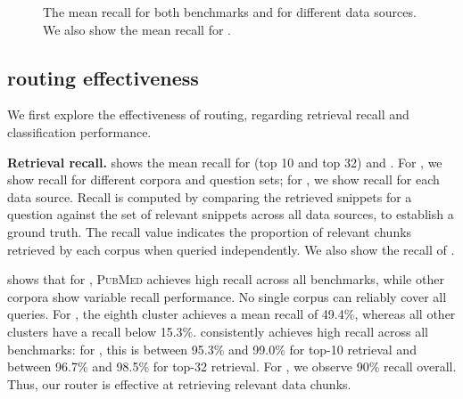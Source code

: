 \begin{figure*}[t]
    \centering
    \caption{The mean recall for both benchmarks and for different data sources. We also show the mean recall for \sys.}
    \label{fig:recall}
\end{figure*}


\subsection{\sys routing effectiveness}
\label{sec:exp_routing_effectiveness}
We first explore the effectiveness of \sys routing, regarding retrieval recall and classification performance.

\textbf{Retrieval recall.}
 shows the mean recall for \mirage (top 10 and top 32) and \mmlu.
For \mirage, we show recall for different corpora and question sets; for \mmlu, we show recall for each data source.
Recall is computed by comparing the retrieved snippets for a question against the set of relevant snippets across all data sources, to establish a ground truth.
The recall value indicates the proportion of relevant chunks retrieved by each corpus when queried independently. We also show the recall of \sys.

 shows that for \mirage, \textsc{PubMed} achieves high recall across all benchmarks, while other corpora show variable recall performance.
No single corpus can reliably cover all queries.
For \mmlu, the eighth cluster achieves a mean recall of 49.4\%, whereas all other clusters have a recall below 15.3\%.
\sys consistently achieves high recall across all benchmarks: for \mirage, this is between 95.3\% and 99.0\% for top-10 retrieval and between 96.7\% and 98.5\% for top-32 retrieval.
For \mmlu, we observe 90\% recall overall.
Thus, our router is effective at retrieving relevant data chunks.

\begin{table}[t]
\centering
{}
\caption{Classification metrics (averages and standard deviations) for our router and for different experiments.}
\label{tab:summary_classification_results}
\end{table}

